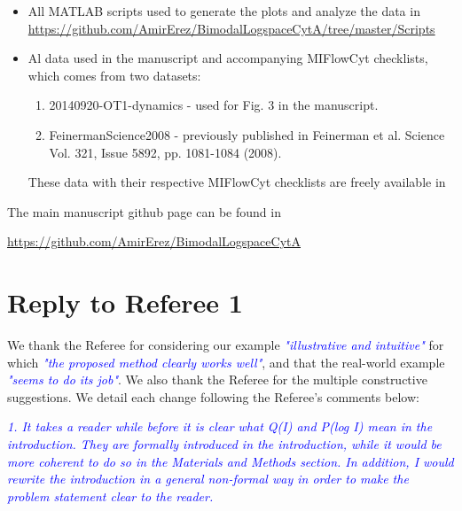 \documentclass[letter,11pt,draft]{article}
\newcommand{\re}[1]{\emph{\textcolor{blue}{#1}}}
\begin{document}
\begin{itemize}
\item All MATLAB scripts used to generate the plots and analyze the data in
\\
{\small \href{https://github.com/AmirErez/BimodalLogspaceCytA/tree/master/Scripts}{https://github.com/AmirErez/BimodalLogspaceCytA/tree/master/Scripts}}
\item Al data used in the manuscript and accompanying MIFlowCyt checklists, which comes from two datasets:
	\begin{enumerate}
	\item 20140920-OT1-dynamics - used for Fig. 3 in the manuscript.
	\item FeinermanScience2008 - previously published in Feinerman et al. Science Vol. 321, Issue 5892, pp. 1081-1084 (2008). 
	\end{enumerate}
These data with their respective MIFlowCyt checklists are freely available in

\smallskip
{}

\end{itemize} 

\smallskip
The main manuscript github page can be found in

\smallskip
\href{https://github.com/AmirErez/BimodalLogspaceCytA}{https://github.com/AmirErez/BimodalLogspaceCytA}
\newpage

\section*{Reply to Referee 1}

We thank the Referee for considering our example \re{"illustrative and intuitive"} for which \re{"the proposed method clearly works well"}, and that the real-world example \re{"seems to do its job"}. We also thank the Referee for the multiple constructive suggestions. We detail each change following the Referee's comments below:

\smallskip

\re{1. It takes a reader while before it is clear what Q(I) and P(log I) mean in the introduction. They are formally introduced in the introduction, while it would be more coherent to do so in the Materials and Methods section. In addition, I would rewrite the introduction in a general non-formal way in order to make the problem statement clear to the reader.}
\end{document}
